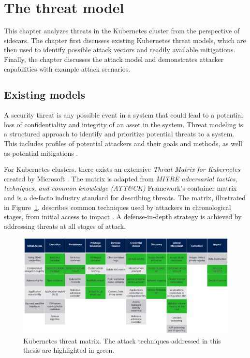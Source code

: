 \documentclass[english, 12pt, a4paper, sci, utf8, a-2b, online]{aaltothesis}
\begin{document}
\section{The threat model} \label{sec:threats}

This chapter analyzes threats in the Kubernetes cluster from the perspective of sidecars.
The chapter first discusses existing Kubernetes threat models, which are then used to identify possible attack vectors and readily available mitigations.
Finally, the chapter discusses the attack model and demonstrates attacker capabilities with example attack scenarios.

\subsection{Existing models}

A security threat is any possible event in a system that could lead to a potential loss of confidentiality and integrity of an asset in the system.
Threat modeling is a structured approach to identify and prioritize potential threats to a system.
This includes profiles of potential attackers and their goals and methods, as well as potential mitigations \cite{shevchenko2018threat}.

For Kubernetes clusters, there exists an extensive \emph{Threat Matrix for Kubernetes} created by Microsoft \cite{k8s-threat-matrix}.
The matrix is adapted from \emph{MITRE adversarial tactics, techniques, and common knowledge (ATT\&CK)} Framework's container matrix \cite{mitre-matrix} and is a de-facto industry standard for describing threats.
The matrix, illustrated in Figure~\ref{fig:threat-matrix}, describes common techniques used by attackers in chronological stages, from initial access to impact \cite{minna2021understanding}.
A defense-in-depth strategy is achieved by addressing threats at all stages of attack.

\begin{figure}[h!]
  \centering
  \includegraphics[width=\linewidth]{files/Matrix.png}
  \caption{Kubernetes threat matrix. The attack techniques addressed in this thesis are highlighted in green.}
  \label{fig:threat-matrix}
\end{figure}
\end{document}
